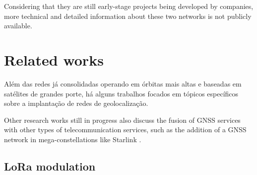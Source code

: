 
Considering that they are still early-stage projects being developed by companies, more technical and detailed information about these two networks is not publicly available.

\section{Related works}

Além das redes já consolidadas operando em órbitas mais altas e baseadas em satélites de grandes porte, há alguns trabalhos focados em tópicos específicos sobre a implantação de redes de geolocalização.

Other research works still in progress also discuss the fusion of GNSS services with other types of telecommunication services, such as the addition of a GNSS network in mega-constellations like Starlink \cite{iannucci2022}.

\subsection{LoRa modulation}



